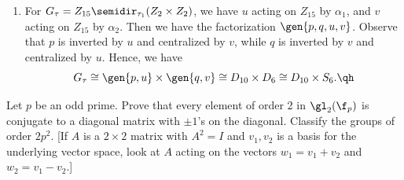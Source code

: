 \begin{solalph}
\begin{itemize}
\begin{enumerate}
            \[G_\sigma \cong \gen{pqv, u} \cong D_{60}.\]
            \item For $G_\tau = Z_{15} \semidir_{\tau_1} (Z_2 \times Z_2)$, we have $u$ acting on $Z_{15}$ by $\alpha_1$, and $v$ acting on $Z_{15}$ by $\alpha_2$. Then we have the factorization $\gen{p, q, u, v}$. Observe that $p$ is inverted by $u$ and centralized by $v$, while $q$ is inverted by $v$ and centralized by $u$. Hence, we have
            \[G_\tau \cong \gen{p, u} \times \gen{q, v} \cong D_{10} \times D_6 \cong D_{10} \times S_6. \qh\]
        \end{enumerate}
    \end{itemize}
\end{solalph}

\begin{exercise}\label{ex5.5.15}
    Let $p$ be an odd prime. Prove that every element of order 2 in $\gl_2(\f_p)$ is conjugate to a diagonal matrix with $\pm 1$'s on the diagonal. Classify the groups of order $2p^2$. [If $A$ is a $2 \times 2$ matrix with $A^2 = I$ and $v_1, v_2$ is a basis for the underlying vector space, look at $A$ acting on the vectors $w_1 = v_1 + v_2$ and $w_2 = v_1 - v_2$.]
\end{exercise}

